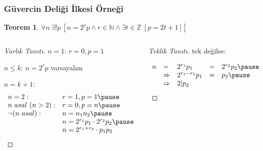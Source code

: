 \documentclass[dvipsnames]{beamer}
\theoremstyle{definition}
\theoremstyle{example}
\theoremstyle{plain}
\newtheorem{teorem}[theorem]{Teorem}
\begin{document}
\begin{frame}
  \frametitle{Güvercin Deliği İlkesi Örneği}

  \begin{teorem}
    $\forall n~\exists ! p~
      [n = 2^r p \wedge r \in \mathbb{N}
        \wedge \exists t \in \mathbb Z~[p = 2t + 1]]$\\
  \end{teorem}

  \pause
  \begin{columns}[t]
    \begin{proof}[Varlık Tanıtı]
      $n = 1$: $r = 0, p = 1$

      \pause
      $n \leq k$: $n = 2^r p$ varsayalım

      \pause
      $n = k + 1$:
      \vspace{-9pt}
      \[
        \begin{array}{ll}
          n=2:           & r = 1, p = 1\pause\\
          n~asal~(n>2):  & r = 0, p = n\pause\\
          \neg (n~asal): & n = n_1 n_2\pause\\
                         & n = 2^{r_1} p_1 \cdot 2^{r_2} p_2\pause\\
                         & n = 2^{r_1+r_2} \cdot p_1 p_2
        \end{array}
      \]
    \end{proof}

    \pause
    \begin{proof}[Teklik Tanıtı]
      tek değilse:

      \pause
      \[
        \begin{array}{lllll}
          n & =           & 2^{r_1} p_1     & = & 2^{r_2} p_2\pause\\
            & \Rightarrow & 2^{r_1-r_2} p_1 & = & p_2\pause\\
            & \Rightarrow & 2 | p_2
        \end{array}
      \]
    \end{proof}
  \end{columns}
\end{frame}
\end{document}
